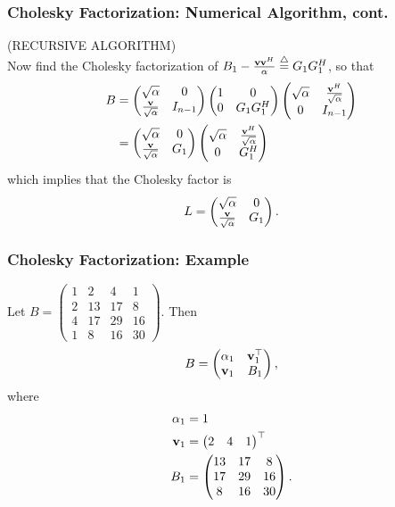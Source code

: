 \documentclass{beamer}
\begin{document}
\begin{frame}\frametitle{Cholesky Factorization: Numerical Algorithm, cont.}
	(RECURSIVE ALGORITHM) \\
	Now find the Cholesky factorization of $B_1 - \frac{\mathbf{v}\mathbf{v}^H}{\alpha} \stackrel{\triangle}{=}  G_1G_1^H$, so that
	\begin{align*}
		B &= 
			\begin{pmatrix}
				\sqrt{\alpha} & 0\\
				\frac{\mathbf{v}}{\sqrt{\alpha}} & I_{n-1}
			\end{pmatrix}
			\begin{pmatrix}
				1 & 0\\
				0 & G_1G_1^H
			\end{pmatrix}
			\begin{pmatrix}
				\sqrt{\alpha} & \frac{\mathbf{v}^H}{\sqrt{\alpha}}\\
				0 & I_{n-1}
			\end{pmatrix} \\
		 &=
			\begin{pmatrix}
				\sqrt{\alpha} & 0\\
				\frac{\mathbf{v}}{\sqrt{\alpha}} & G_1
			\end{pmatrix}
			\begin{pmatrix}
				\sqrt{\alpha} & \frac{\mathbf{v}^H}{\sqrt{\alpha}}\\
				0 & G_1^H
			\end{pmatrix}
	\end{align*}
	which implies that the Cholesky factor is
	\[ 
		L = \begin{pmatrix}
				\sqrt{\alpha} & 0\\
				\frac{\mathbf{v}}{\sqrt{\alpha}} & G_1
			\end{pmatrix}.
	\]
\end{frame}

\begin{frame}\frametitle{Cholesky Factorization: Example}
	Let 
	\(
		B = \begin{pmatrix} 
				1 & 2 & 4 & 1 \\
				2 & 13 & 17 & 8 \\
				4 & 17 & 29 & 16 \\
				1 & 8 & 16 & 30
 			\end{pmatrix}.
 	\)
 	Then 
 	\[
 		B = \begin{pmatrix}
 				\alpha_1 & \mathbf{v}_1^\top \\ 
 				\mathbf{v}_1 & B_1
 			\end{pmatrix},
 	\]
 	where
 	\begin{align*}
 		\alpha_1 &= 1 \\
 		\mathbf{v}_1 &= \begin{pmatrix} 2 & 4 & 1 \end{pmatrix}^\top \\
 		B_1 &= \begin{pmatrix}
 					13 & 17 & 8 \\
 					17 & 29 & 16 \\
 					8 & 16 & 30	
 				\end{pmatrix}.
 	\end{align*}
\end{frame}
\end{document}
